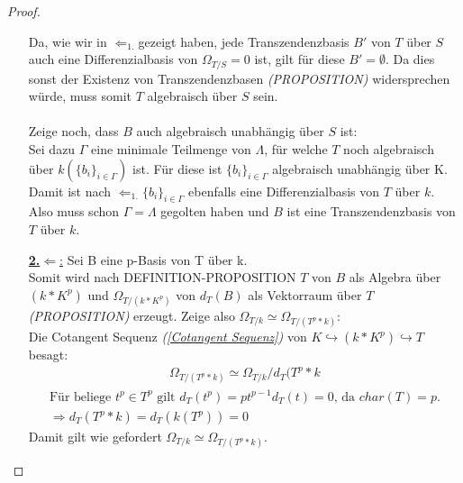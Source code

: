 \documentclass[10pt,a4paper]{report}
\newcommand{\comment}[1]{}
\newcommand{\divR}[2]{\Omega_{#1/#2}}
\newcommand{\divf}[1]{d_{#1}}
\begin{document}
\begin{proof}
\begin{itemize}
Da, wie wir in \glqq$\Leftarrow_{1.}$\grqq gezeigt haben, jede Transzendenzbasis $B'$ von $T$ über $S$ auch eine Differenzialbasis von $\divR{T}{S} = 0$ ist, gilt für diese $B' = \emptyset$. Da dies sonst der Existenz von Transzendenzbasen \textit{(PROPOSITION)} \comment{\label{*Transzendenzbasis existiert immer}} widersprechen würde, muss somit $T$ algebraisch über $S$ sein.\\
\ \\
Zeige noch, dass $B$ auch algebraisch unabhängig über $S$ ist:\\
Sei dazu $\Gamma$ eine minimale Teilmenge von $\Lambda$, für welche $T$ noch algebraisch über $k(\lbrace b_i \rbrace_{i \in \Gamma})$ ist. Für diese ist $\lbrace b_i \rbrace_{i \in \Gamma}$ algebraisch unabhängig über K.\\
Damit ist nach \glqq$\Leftarrow_{1.}$\grqq $\lbrace b_i \rbrace_{i \in \Gamma}$ ebenfalls eine Differenzialbasis von $T$ über $k$. Also muss schon $\Gamma = \Lambda$ gegolten haben und $B$ ist eine Transzendenzbasis von $T$ über $k$.
\item[\underline{\textbf{2.}\glqq$\Leftarrow$\grqq:}] Sei B eine p-Basis von T über k.\\
Somit wird nach DEFINITION-PROPOSITION \comment{\label{*p-Basis ist minnimaler Erzeuger von T als Algebra}} $T$ von $B$ als Algebra über $(k * K^p)$ und $\divR{T}{(k * K^p)}$ von $\divf{T}(B)$ als Vektorraum über $T$ 
\textit{(PROPOSITION)} \comment{\label{*Differenzial vererbt Erzeugendensystem}} erzeugt. Zeige also $\divR{T}{k} \simeq \divR{T}{(T^p * k)}$:\\
Die Cotangent Sequenz \textit{(\cref{Cotangent Sequenz})} von $K \hookrightarrow (k * K^p) \hookrightarrow T$ besagt:
\begin{gather*}
\divR{T}{(T^p * k)} \simeq \divR{T}{k}/\divf{T}(T^p * k
\end{gather*}
\begin{gather*}
\text{Für beliege } t^p \in T^p \text{ gilt } \divf{T}(t^p) = pt^{p-1}\divf{T}(t) = 0 \text{,  da }char(T) = p.\\
\Rightarrow \divf{T}(T^p * k) = \divf{T}(k(T^p)) = 0
\end{gather*}
Damit gilt wie gefordert $\divR{T}{k} \simeq \divR{T}{(T^p * k)}$.


\end{itemize}
\end{proof}
\end{document}
